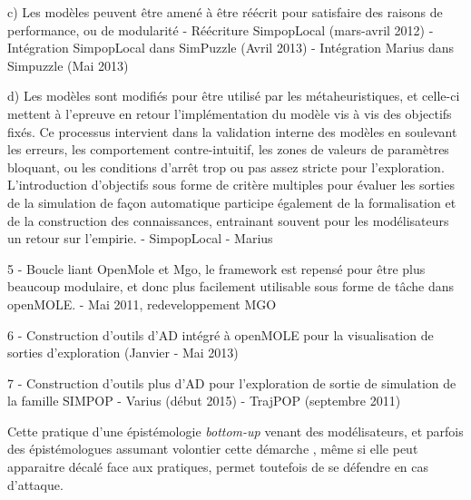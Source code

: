 	c) Les modèles peuvent être amené à être réécrit pour satisfaire des raisons de performance, ou de modularité
		- Réécriture SimpopLocal (mars-avril 2012)
		- Intégration SimpopLocal dans SimPuzzle (Avril 2013)
		- Intégration Marius dans Simpuzzle (Mai 2013)

	d) Les modèles sont modifiés pour être utilisé par les métaheuristiques, et celle-ci mettent à l'epreuve en retour l'implémentation du modèle vis à vis des objectifs fixés. Ce processus intervient dans la validation interne des modèles en soulevant les erreurs, les comportement contre-intuitif, les zones de valeurs de paramètres bloquant, ou les conditions d'arrêt trop ou pas assez stricte pour l'exploration. L'introduction d'objectifs sous forme de critère multiples pour évaluer les sorties de la simulation de façon automatique participe également de la formalisation et de la construction des connaissances, entrainant souvent pour les modélisateurs un retour sur l'empirie.
		- SimpopLocal \autocites{Schmitt2014,Schmitt2015}
		- Marius \autocite{Cottineau2014b}

5 - Boucle liant OpenMole et Mgo, le framework est repensé pour être plus beaucoup modulaire, et donc plus facilement utilisable sous forme de tâche dans openMOLE. 
	- Mai 2011, redeveloppement MGO

6 - Construction d'outils d'AD intégré à openMOLE pour la visualisation de sorties d'exploration (Janvier - Mai 2013)

7 - Construction d'outils plus d'AD pour l'exploration de sortie de simulation de la famille SIMPOP 
	- Varius (début 2015)
	- TrajPOP (septembre 2011)






Cette pratique d'une épistémologie \textit{bottom-up} venant des modélisateurs, et parfois des épistémologues assumant volontier cette démarche \autocite{Varenne2014}, même si elle peut apparaitre décalé face aux pratiques, permet toutefois de se défendre en cas d'attaque.


